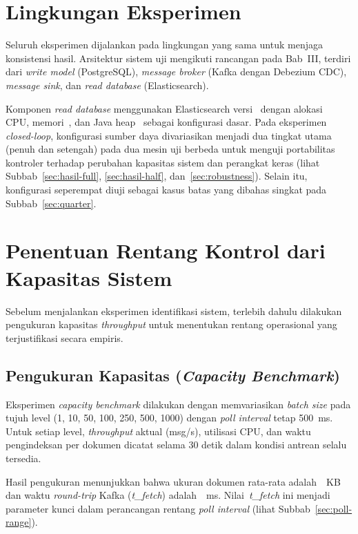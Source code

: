 \section{Lingkungan Eksperimen}

Seluruh eksperimen dijalankan pada lingkungan yang sama untuk menjaga konsistensi hasil.
Arsitektur sistem uji mengikuti rancangan pada Bab~III, terdiri dari \emph{write model} (PostgreSQL),
\emph{message broker} (Kafka dengan Debezium CDC), \emph{message sink}, dan \emph{read database}
(Elasticsearch).

Komponen \emph{read database} menggunakan Elasticsearch versi~\esversion{} dengan alokasi~\escpus{}
CPU, memori~\esmemory{}, dan Java heap~\esjavaheap{} sebagai konfigurasi dasar.
Pada eksperimen \emph{closed-loop}, konfigurasi sumber daya divariasikan menjadi dua tingkat
utama (penuh dan setengah) pada dua mesin uji berbeda untuk menguji portabilitas kontroler
terhadap perubahan kapasitas sistem dan perangkat keras (lihat Subbab~\ref{sec:hasil-full},
\ref{sec:hasil-half}, dan~\ref{sec:robustness}).
Selain itu, konfigurasi seperempat diuji sebagai kasus batas yang dibahas singkat pada
Subbab~\ref{sec:quarter}.

\section{Penentuan Rentang Kontrol dari Kapasitas Sistem}

Sebelum menjalankan eksperimen identifikasi sistem, terlebih dahulu dilakukan pengukuran kapasitas
\emph{throughput} untuk menentukan rentang operasional yang terjustifikasi secara empiris.

\subsection{Pengukuran Kapasitas (\emph{Capacity Benchmark})}

Eksperimen \emph{capacity benchmark} dilakukan dengan memvariasikan \emph{batch size} pada tujuh level (1, 10, 50, 100, 250, 500, 1000) dengan
\emph{poll interval} tetap 500~ms.
Untuk setiap level, \emph{throughput} aktual (msg/s), utilisasi CPU, dan waktu pengindeksan per
dokumen dicatat selama 30 detik dalam kondisi antrean selalu tersedia.

Hasil pengukuran menunjukkan bahwa ukuran dokumen rata-rata adalah~\docsizeKB~KB dan waktu
\emph{round-trip} Kafka (\emph{t\_fetch}) adalah~\tfetchms~ms.
Nilai~\emph{t\_fetch} ini menjadi parameter kunci dalam perancangan rentang \emph{poll interval}
(lihat Subbab~\ref{sec:poll-range}).

